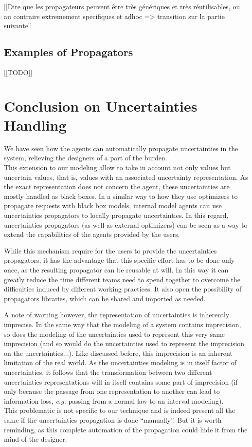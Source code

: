 [[Dire que les propagateurs peuvent être très génériques et très réutilisables, ou au contraire extremement specifiques et adhoc => transition sur la partie suivante]]


\subsection{Examples of Propagators}

[[TODO]]

\section{Conclusion on Uncertainties Handling}

We have seen how the agents can automatically propagate uncertainties in the system, relieving the designers of a part of the burden.\\
This extension to our modeling allow to take in account not only values but uncertain values, that is, values with an associated uncertainty representation. As the exact representation does not concern the agent, these uncertainties are mostly handled as black boxes. In a similar way to how they use optimizers to propagate requests with black box models, internal model agents can use uncertainties propagators to locally propagate uncertainties. In this regard, uncertainties propagators (as well as external optimizers) can be seen as a way to extend the capabilities of the agents provided by the users.

While this mechanism require for the users to provide the uncertainties propagators, it has the advantage that this specific effort has to be done only once, as the resulting propagator can be reusable at will. In this way it can greatly reduce the time different teams need to spend together to overcome the difficulties induced by different working practices. It also open the possibility of propagators libraries, which can be shared and imported as needed.

A note of warning however, the representation of uncertainties is inherently imprecise. In the same way that the modeling of a system contains imprecision, so does the modeling of the uncertainties used to represent this very same imprecision (and so would do the uncertainties used to represent the imprecision on the uncertainties...). Like discussed before, this imprecision is an inherent limitation of the real world. As the uncertainties modeling is in itself factor of uncertainties, it follows that the transformation between two different uncertainties representations will in itself contains some part of imprecision (if only because the passage from one representation to another can lead to information loss, \emph{e.g.} passing from a normal law to an interval modeling).\\
This problematic is not specific to our technique and is indeed present all the same if the uncertainties propagation is done \enquote{manually}. But it is worth reminding, as this complete automation of the propagation could hide it from the mind of the designer.

